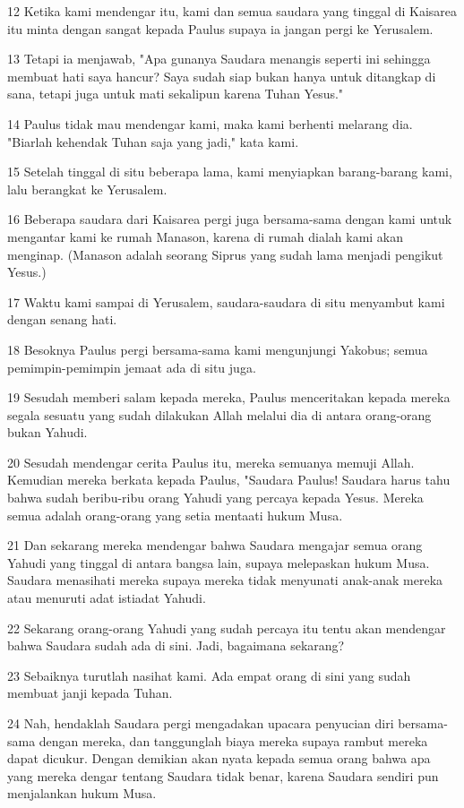 \par 12 Ketika kami mendengar itu, kami dan semua saudara yang tinggal di Kaisarea itu minta dengan sangat kepada Paulus supaya ia jangan pergi ke Yerusalem.
\par 13 Tetapi ia menjawab, "Apa gunanya Saudara menangis seperti ini sehingga membuat hati saya hancur? Saya sudah siap bukan hanya untuk ditangkap di sana, tetapi juga untuk mati sekalipun karena Tuhan Yesus."
\par 14 Paulus tidak mau mendengar kami, maka kami berhenti melarang dia. "Biarlah kehendak Tuhan saja yang jadi," kata kami.
\par 15 Setelah tinggal di situ beberapa lama, kami menyiapkan barang-barang kami, lalu berangkat ke Yerusalem.
\par 16 Beberapa saudara dari Kaisarea pergi juga bersama-sama dengan kami untuk mengantar kami ke rumah Manason, karena di rumah dialah kami akan menginap. (Manason adalah seorang Siprus yang sudah lama menjadi pengikut Yesus.)
\par 17 Waktu kami sampai di Yerusalem, saudara-saudara di situ menyambut kami dengan senang hati.
\par 18 Besoknya Paulus pergi bersama-sama kami mengunjungi Yakobus; semua pemimpin-pemimpin jemaat ada di situ juga.
\par 19 Sesudah memberi salam kepada mereka, Paulus menceritakan kepada mereka segala sesuatu yang sudah dilakukan Allah melalui dia di antara orang-orang bukan Yahudi.
\par 20 Sesudah mendengar cerita Paulus itu, mereka semuanya memuji Allah. Kemudian mereka berkata kepada Paulus, "Saudara Paulus! Saudara harus tahu bahwa sudah beribu-ribu orang Yahudi yang percaya kepada Yesus. Mereka semua adalah orang-orang yang setia mentaati hukum Musa.
\par 21 Dan sekarang mereka mendengar bahwa Saudara mengajar semua orang Yahudi yang tinggal di antara bangsa lain, supaya melepaskan hukum Musa. Saudara menasihati mereka supaya mereka tidak menyunati anak-anak mereka atau menuruti adat istiadat Yahudi.
\par 22 Sekarang orang-orang Yahudi yang sudah percaya itu tentu akan mendengar bahwa Saudara sudah ada di sini. Jadi, bagaimana sekarang?
\par 23 Sebaiknya turutlah nasihat kami. Ada empat orang di sini yang sudah membuat janji kepada Tuhan.
\par 24 Nah, hendaklah Saudara pergi mengadakan upacara penyucian diri bersama-sama dengan mereka, dan tanggunglah biaya mereka supaya rambut mereka dapat dicukur. Dengan demikian akan nyata kepada semua orang bahwa apa yang mereka dengar tentang Saudara tidak benar, karena Saudara sendiri pun menjalankan hukum Musa.
